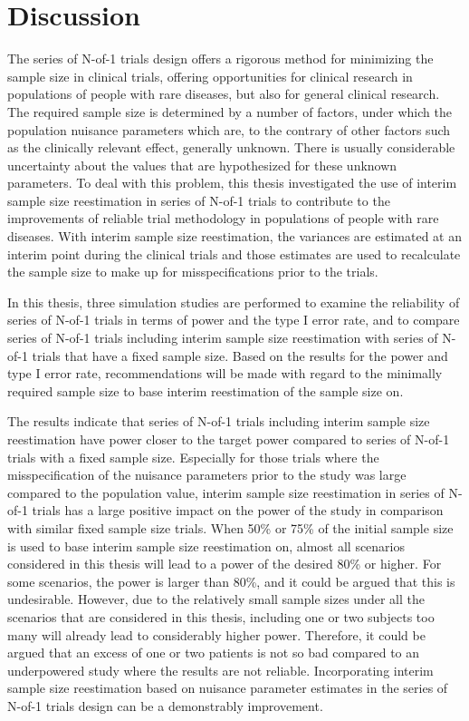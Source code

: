 \documentclass[AMA,STIX1COL,]{WileyNJD-v2}
\begin{document}
\hypertarget{discussion}{%
\section{Discussion}\label{discussion}}

The series of N-of-1 trials design offers a rigorous method for minimizing the sample size in clinical trials, offering opportunities for clinical research in populations of people with rare diseases, but also for general clinical research. The required sample size is determined by a number of factors, under which the population nuisance parameters which are, to the contrary of other factors such as the clinically relevant effect, generally unknown. There is usually considerable uncertainty about the values that are hypothesized for these unknown parameters. To deal with this problem, this thesis investigated the use of interim sample size reestimation in series of N-of-1 trials to contribute to the improvements of reliable trial methodology in populations of people with rare diseases. With interim sample size reestimation, the variances are estimated at an interim point during the clinical trials and those estimates are used to recalculate the sample size to make up for misspecifications prior to the trials.

In this thesis, three simulation studies are performed to examine the reliability of series of N-of-1 trials in terms of power and the type I error rate, and to compare series of N-of-1 trials including interim sample size reestimation with series of N-of-1 trials that have a fixed sample size. Based on the results for the power and type I error rate, recommendations will be made with regard to the minimally required sample size to base interim reestimation of the sample size on.

The results indicate that series of N-of-1 trials including interim sample size reestimation have power closer to the target power compared to series of N-of-1 trials with a fixed sample size. Especially for those trials where the misspecification of the nuisance parameters prior to the study was large compared to the population value, interim sample size reestimation in series of N-of-1 trials has a large positive impact on the power of the study in comparison with similar fixed sample size trials. When 50\% or 75\% of the initial sample size is used to base interim sample size reestimation on, almost all scenarios considered in this thesis will lead to a power of the desired 80\% or higher. For some scenarios, the power is larger than 80\%, and it could be argued that this is undesirable. However, due to the relatively small sample sizes under all the scenarios that are considered in this thesis, including one or two subjects too many will already lead to considerably higher power. Therefore, it could be argued that an excess of one or two patients is not so bad compared to an underpowered study where the results are not reliable. Incorporating interim sample size reestimation based on nuisance parameter estimates in the series of N-of-1 trials design can be a demonstrably improvement.
\end{document}
